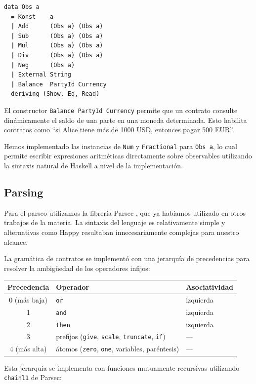 \documentclass[a4paper, 12pt]{article}
\begin{document}
\begin{lstlisting}[caption={Tipo de datos Obs (AST.hs)}]
data Obs a
  = Konst    a
  | Add      (Obs a) (Obs a)
  | Sub      (Obs a) (Obs a)
  | Mul      (Obs a) (Obs a)
  | Div      (Obs a) (Obs a)
  | Neg      (Obs a)
  | External String
  | Balance  PartyId Currency
  deriving (Show, Eq, Read)
\end{lstlisting}

El constructor \texttt{Balance PartyId Currency} permite que un contrato consulte dinámicamente el saldo de una parte en una moneda determinada. Esto habilita contratos como ``si Alice tiene más de 1000 USD, entonces pagar 500 EUR''.

Hemos implementado las instancias de \texttt{Num} y \texttt{Fractional} para \texttt{Obs a}, lo cual permite escribir expresiones aritméticas directamente sobre observables utilizando la sintaxis natural de Haskell a nivel de la implementación.

\subsection{Parsing}

Para el parseo utilizamos la librería Parsec \cite{parsec}, que ya habíamos utilizado en otros trabajos de la materia. La sintaxis del lenguaje es relativamente simple y alternativas como Happy resultaban innecesariamente complejas para nuestro alcance.

La gramática de contratos se implementó con una jerarquía de precedencias para resolver la ambigüedad de los operadores infijos:

\begin{center}
\begin{tabular}{c l l}
\toprule
\textbf{Precedencia} & \textbf{Operador} & \textbf{Asociatividad} \\
\midrule
0 (más baja) & \texttt{or} & izquierda \\
1 & \texttt{and} & izquierda \\
2 & \texttt{then} & izquierda \\
3 & prefijos (\texttt{give}, \texttt{scale}, \texttt{truncate}, \texttt{if}) & --- \\
4 (más alta) & átomos (\texttt{zero}, \texttt{one}, variables, paréntesis) & --- \\
\bottomrule
\end{tabular}
\end{center}

Esta jerarquía se implementa con funciones mutuamente recursivas utilizando \texttt{chainl1} de Parsec:
\end{document}
